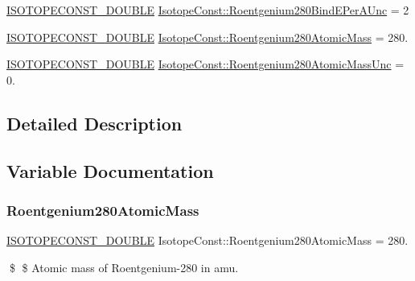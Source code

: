 \begin{DoxyCompactItemize}
\item 
\mbox{\hyperlink{group___isotope_const-_macros_ga8f45a7272ce02c0b4c65c44636ed719a}{I\+S\+O\+T\+O\+P\+E\+C\+O\+N\+S\+T\+\_\+\+D\+O\+U\+B\+LE}} \mbox{\hyperlink{group___isotope_const-_roentgenium-_rg280_gabd369b97d76ec893fc93c70e84e0f089}{Isotope\+Const\+::\+Roentgenium280\+Bind\+E\+Per\+A\+Unc}} = 2
\item 
\mbox{\hyperlink{group___isotope_const-_macros_ga8f45a7272ce02c0b4c65c44636ed719a}{I\+S\+O\+T\+O\+P\+E\+C\+O\+N\+S\+T\+\_\+\+D\+O\+U\+B\+LE}} \mbox{\hyperlink{group___isotope_const-_roentgenium-_rg280_gac065a4a63ffbaef5430d7d38e8744261}{Isotope\+Const\+::\+Roentgenium280\+Atomic\+Mass}} = 280.
\item 
\mbox{\hyperlink{group___isotope_const-_macros_ga8f45a7272ce02c0b4c65c44636ed719a}{I\+S\+O\+T\+O\+P\+E\+C\+O\+N\+S\+T\+\_\+\+D\+O\+U\+B\+LE}} \mbox{\hyperlink{group___isotope_const-_roentgenium-_rg280_gae1adc89f051a07d76eaa247946fa0fa3}{Isotope\+Const\+::\+Roentgenium280\+Atomic\+Mass\+Unc}} = 0.
\end{DoxyCompactItemize}


\subsection{Detailed Description}


\subsection{Variable Documentation}
\mbox{\label{group___isotope_const-_roentgenium-_rg280_gac065a4a63ffbaef5430d7d38e8744261}} 
\subsubsection{\texorpdfstring{Roentgenium280\+Atomic\+Mass}{Roentgenium280AtomicMass}}
{\footnotesize\ttfamily \mbox{\hyperlink{group___isotope_const-_macros_ga8f45a7272ce02c0b4c65c44636ed719a}{I\+S\+O\+T\+O\+P\+E\+C\+O\+N\+S\+T\+\_\+\+D\+O\+U\+B\+LE}} Isotope\+Const\+::\+Roentgenium280\+Atomic\+Mass = 280.}

\$ \$ Atomic mass of Roentgenium-\/280 in amu. \mbox{\label{group___isotope_const-_roentgenium-_rg280_gae1adc89f051a07d76eaa247946fa0fa3}} 

